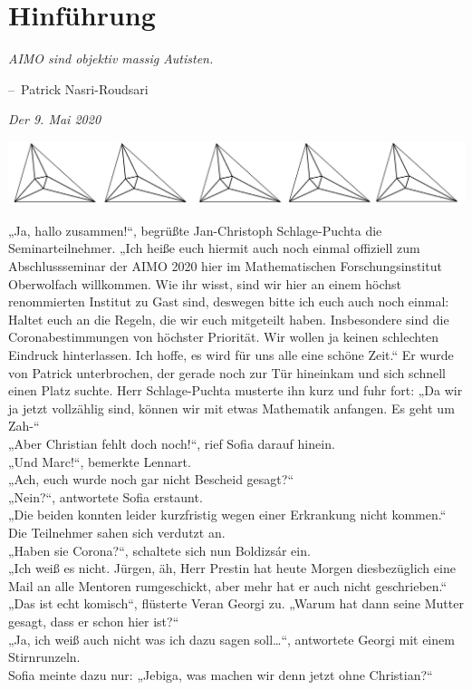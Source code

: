 \documentclass[oneside]{memoir}
\makeatletter
\newcommand{\parasep}{
\bigskip
\bigskip
\begin{center} 
   \includegraphics[scale=.08]{parasep5.jpg} 
\end{center}
\bigskip
\bigskip
}
\newenvironment{chapquote}[2][2em]
  {\setlength{\@tempdima}{#1}%
   \def\chapquote@author{#2}%
   \parshape 1 \@tempdima \dimexpr\textwidth-2\@tempdima\relax%
   \itshape}
  {\par\normalfont\hfill--\ \chapquote@author\hspace*{\@tempdima}\par\bigskip}
\makeatother
\begin{document}
\chapter{Hinführung} %
\begin{chapquote}{Patrick Nasri-Roudsari}
\glqq AIMO sind objektiv massig Autisten.\grqq
\end{chapquote}
\textit{Der 9. Mai 2020} \\
\parasep
„Ja, hallo zusammen!“, begrüßte Jan-Christoph Schlage-Puchta die Seminarteilnehmer. „Ich heiße euch hiermit auch noch einmal offiziell zum Abschlussseminar der AIMO 2020 hier im Mathematischen Forschungsinstitut Oberwolfach willkommen. Wie ihr wisst, sind wir hier an einem höchst renommierten Institut zu Gast sind, deswegen bitte ich euch auch noch einmal: Haltet euch an die Regeln, die wir euch mitgeteilt haben. Insbesondere sind die Coronabestimmungen von höchster Priorität. Wir wollen ja keinen schlechten Eindruck hinterlassen. Ich hoffe, es wird für uns alle eine schöne Zeit.“ Er wurde von Patrick unterbrochen, der gerade noch zur Tür hineinkam und sich schnell einen Platz suchte. Herr Schlage-Puchta musterte ihn kurz und fuhr fort: „Da wir ja jetzt vollzählig sind, können wir mit etwas Mathematik anfangen. Es geht um Zah-“ \\
„Aber Christian fehlt doch noch!“, rief Sofia darauf hinein. \\
„Und Marc!“, bemerkte Lennart. \\
„Ach, euch wurde noch gar nicht Bescheid gesagt?“ \\
„Nein?“, antwortete Sofia erstaunt. \\
„Die beiden konnten leider kurzfristig wegen einer Erkrankung nicht kommen.“ \\
Die Teilnehmer sahen sich verdutzt an. \\
„Haben sie Corona?“, schaltete sich nun Boldizsár ein. \\
„Ich weiß es nicht. Jürgen, äh, Herr Prestin hat heute Morgen diesbezüglich eine Mail an alle Mentoren rumgeschickt, aber mehr hat er auch nicht geschrieben.“ \\
„Das ist echt komisch“, flüsterte Veran Georgi zu. „Warum hat dann seine Mutter gesagt, dass er schon hier ist?“ \\
„Ja, ich weiß auch nicht was ich dazu sagen soll\ldots“, antwortete Georgi mit einem Stirnrunzeln. \\
Sofia meinte dazu nur: „Jebiga, was machen wir denn jetzt ohne Christian?“
\end{document}
